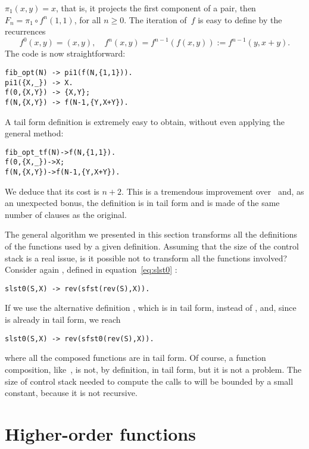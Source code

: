 \(\pi_1(x,y) = x\), that is, it projects the first component of a
pair, then \(F_n = \pi_1 \circ f^n(1,1)\), for all \(n \geqslant
0\). The iteration of~\(f\) is easy to define by the recurrences
\begin{equation*}
f^0(x,y) = (x,y),\quad
f^n(x,y) = f^{n-1}(f(x,y)) := f^{n-1}(y,x+y).
\end{equation*}
The \Erlang code is now straightforward:
\begin{verbatim}
fib_opt(N) -> pi1(f(N,{1,1})).
pi1({X,_}) -> X.
f(0,{X,Y}) -> {X,Y};
f(N,{X,Y}) -> f(N-1,{Y,X+Y}).
\end{verbatim}
A tail form definition is extremely easy to obtain, without even applying
the general method:
\begin{alltt}
fib\_opt\_tf(N) -> f(N,\{1,1\}).
f(0,\{X,\_\})    -> X;\hfill% \emph{Projection done here}
f(N,\{X,Y\})    -> f(N-1,\{Y,X+Y\}).
\end{alltt}
We deduce that its cost is \(n + 2\). This is a tremendous improvement over~ and, as an unexpected bonus, the definition is in tail form and is made of the same number of clauses as the original.  

The general algorithm we presented in this section transforms all the
definitions of the functions used by a given definition. Assuming that
the size of the control stack is a real issue, is it possible not to
transform all the functions involved? Consider again
, defined in equation~\eqref{eq:slst0} :
\begin{verbatim}
slst0(S,X) -> rev(sfst(rev(S),X)).
\end{verbatim}
If we use the alternative definition , which is
in tail form, instead of , and,
since~ is already in tail form, we reach
\begin{verbatim}
slst0(S,X) -> rev(sfst0(rev(S),X)).
\end{verbatim}
where all the composed functions are in tail form. Of course, a function composition, like~, is not, by definition, in tail form, but it is not a problem. The size of control stack needed to compute the calls to  will be bounded by a small constant, because it is not recursive.


\section{Higher-order functions}

